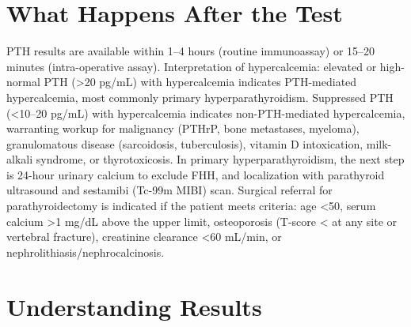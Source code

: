 \section*{What Happens After the Test}
PTH results are available within 1--4 hours (routine immunoassay) or 15--20 minutes (intra-operative assay). Interpretation of hypercalcemia: elevated or high-normal PTH (>20 pg/mL) with hypercalcemia indicates PTH-mediated hypercalcemia, most commonly primary hyperparathyroidism. Suppressed PTH (<10--20 pg/mL) with hypercalcemia indicates non-PTH-mediated hypercalcemia, warranting workup for malignancy (PTHrP, bone metastases, myeloma), granulomatous disease (sarcoidosis, tuberculosis), vitamin D intoxication, milk-alkali syndrome, or thyrotoxicosis. In primary hyperparathyroidism, the next step is 24-hour urinary calcium to exclude FHH, and localization with parathyroid ultrasound and sestamibi (Tc-99m MIBI) scan. Surgical referral for parathyroidectomy is indicated if the patient meets criteria: age <50, serum calcium >1 mg/dL above the upper limit, osteoporosis (T-score < at any site or vertebral fracture), creatinine clearance <60 mL/min, or nephrolithiasis/nephrocalcinosis.

\section*{Understanding Results}

